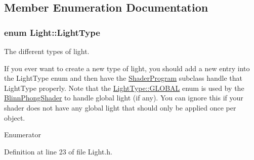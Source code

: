 \subsection{Member Enumeration Documentation}
\hypertarget{class_light_a661d9480e01af8b1612860b9630ef5f8}{}
\subsubsection[{Light\+Type}]{\setlength{\rightskip}{0pt plus 5cm}enum {\bf Light\+::\+Light\+Type}\hspace{0.3cm}{\ttfamily [strong]}}\label{class_light_a661d9480e01af8b1612860b9630ef5f8}


The different types of light. 

If you ever want to create a new type of light, you should add a new entry into the Light\+Type enum and then have the \hyperlink{class_shader_program}{Shader\+Program} subclass handle that Light\+Type properly. Note that the \hyperlink{class_light_a661d9480e01af8b1612860b9630ef5f8a6eecfba72d12922ee1dead07a0ef3334}{Light\+Type\+::\+G\+L\+O\+B\+A\+L} enum is used by the \hyperlink{class_blinn_phong_shader}{Blinn\+Phong\+Shader} to handle global light (if any). You can ignore this if your shader does not have any global light that should only be applied once per object. \begin{Desc}
\item[Enumerator]\par
\begin{description}
\item[{\em 
\hypertarget{class_light_a661d9480e01af8b1612860b9630ef5f8a6eecfba72d12922ee1dead07a0ef3334}{}G\+L\+O\+B\+A\+L\label{class_light_a661d9480e01af8b1612860b9630ef5f8a6eecfba72d12922ee1dead07a0ef3334}
}]\item[{\em 
\hypertarget{class_light_a661d9480e01af8b1612860b9630ef5f8aaebdbcb765394d25d6a604589a890f82}{}P\+O\+I\+N\+T\label{class_light_a661d9480e01af8b1612860b9630ef5f8aaebdbcb765394d25d6a604589a890f82}
}]\end{description}
\end{Desc}


Definition at line 23 of file Light.\+h.



